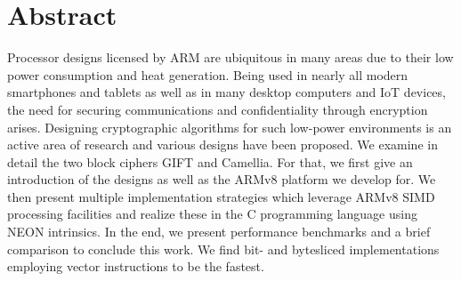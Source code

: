 \chapter*{Abstract}

Processor designs licensed by ARM are ubiquitous in many areas due to their low
power consumption and heat generation. Being used in nearly all modern
smartphones and tablets as well as in many desktop computers and IoT devices,
the need for securing communications and confidentiality through encryption
arises. Designing cryptographic algorithms for such low-power environments is
an active area of research and various designs have been proposed. We examine
in detail the two block ciphers GIFT and Camellia. For that, we first give an
introduction of the designs as well as the ARMv8 platform we develop for. We
then present multiple implementation strategies which leverage ARMv8 SIMD
processing facilities and realize these in the C programming language using
NEON intrinsics. In the end, we present performance benchmarks and a brief
comparison to conclude this work. We find bit- and bytesliced implementations
employing vector instructions to be the fastest.
